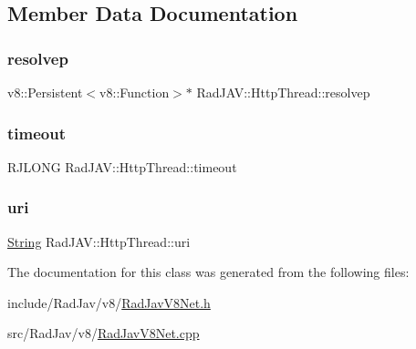 \subsection{Member Data Documentation}
\mbox{\label{class_rad_j_a_v_1_1_http_thread_abd9e9b05592f8825bd096442537ce66a}} 
\subsubsection{\texorpdfstring{resolvep}{resolvep}}
{\footnotesize\ttfamily v8\+::\+Persistent$<$v8\+::\+Function$>$$\ast$ Rad\+J\+A\+V\+::\+Http\+Thread\+::resolvep}

\mbox{\label{class_rad_j_a_v_1_1_http_thread_a491f21d7a22f120890ed87e258352a48}} 
\subsubsection{\texorpdfstring{timeout}{timeout}}
{\footnotesize\ttfamily R\+J\+L\+O\+NG Rad\+J\+A\+V\+::\+Http\+Thread\+::timeout}

\mbox{\label{class_rad_j_a_v_1_1_http_thread_a29766f8c3f2c86f3122e18a8aa757174}} 
\subsubsection{\texorpdfstring{uri}{uri}}
{\footnotesize\ttfamily \mbox{\hyperlink{class_rad_j_a_v_1_1_string}{String}} Rad\+J\+A\+V\+::\+Http\+Thread\+::uri}



The documentation for this class was generated from the following files\+:\begin{DoxyCompactItemize}
\item 
include/\+Rad\+Jav/v8/\mbox{\hyperlink{_rad_jav_v8_net_8h}{Rad\+Jav\+V8\+Net.\+h}}\item 
src/\+Rad\+Jav/v8/\mbox{\hyperlink{_rad_jav_v8_net_8cpp}{Rad\+Jav\+V8\+Net.\+cpp}}\end{DoxyCompactItemize}

